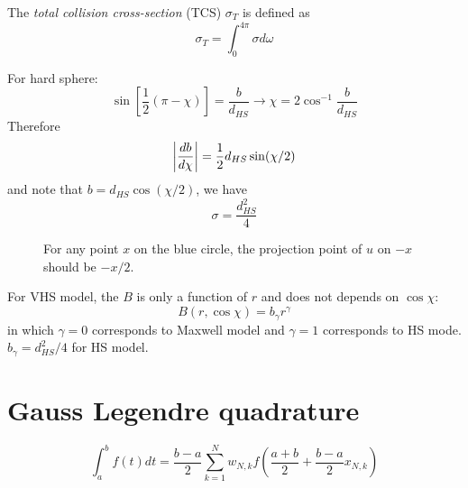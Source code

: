 \documentclass[11pt]{amsart}
\begin{document}
The \emph{total collision cross-section} (TCS) $\sigma_T$ is defined as
\begin{equation}
\sigma_T = \int_0^{4\pi} \sigma d\omega
\end{equation}

For hard sphere:
\begin{equation}
\sin\left[\frac{1}{2}(\pi - \chi)\right]=\frac{b}{d_{HS}} \to  \chi = 2\cos^{-1}\frac{b}{d_{HS}}
\end{equation}
Therefore
\begin{equation}
\left| {db\over d\chi} \right| = {1\over 2}d_{HS}\sin(\chi/2)
\end{equation}
and note that $b = d_{HS} \cos(\chi/2)$, we have
\begin{equation}
\sigma = \frac{d_{HS}^2}{4}
\end{equation}

\begin{figure}[htbp]
\begin{center}
\caption{For any point $x$ on the blue circle, the projection point of $u$ on $-x$ should be $-x/2$.}
\label{fig:identity}
\end{center}
\end{figure}


For VHS model, the $B$ is only a function of $r$ and does not depends on $\cos \chi$:
\begin{equation}
 {B}(r,\cos\chi) =  b_\gamma r^\gamma
\end{equation}
in which $\gamma = 0$ corresponds to Maxwell model and $\gamma = 1$ corresponds to HS mode. $b_\gamma = d_{HS}^2/4$ for HS model.


\section{Gauss Legendre quadrature}
\begin{equation}
\int_{a}^{b} f(t) d t=\frac{b-a}{2} \sum_{k=1}^{N} w_{N, k} f\left(\frac{a+b}{2}+\frac{b-a}{2} x_{N, k}\right)
\end{equation}
\end{document}
